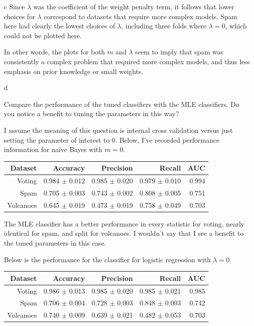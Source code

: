 \documentclass[fleqn]{homework}
\begin{document}
\begin{problem}{c}
    Since $\lambda$ was the coefficient of the weight penalty term, it follows
    that lower choices for $\lambda$ correspond to datasets that require more
    complex models.  Spam here had clearly the lowest choices of $\lambda$,
    including three folds where $\lambda=0$, which could not be plotted here.

    In other words, the plots for both $m$ and $\lambda$ seem to imply that spam
    was consistently a complex problem that required more complex models, and
    thus less emphasis on prior knowledge or small weights.
    
  \end{problem}

  \begin{problem}{d}
    \begin{question}
      Compare the performance of the tuned classifiers with the MLE classifiers.
      Do you notice a benefit to tuning the parameters in this way?
    \end{question}

    I assume the meaning of this question is internal cross validation versus
    just setting the parameter of interest to 0.  Below, I've recorded
    performance information for na\"ive Bayes with $m=0$.

    \vspace{0.3cm}
    \begin{tabular}{rrrrr}
      \hline
      Dataset & Accuracy & Precision & Recall & AUC \\
      \hline
      Voting & 0.984 $\pm$ 0.012 & 0.985 $\pm$ 0.020 & 0.979 $\pm$ 0.010 & 0.994 \\
      Spam & 0.705 $\pm$ 0.003 & 0.743 $\pm$ 0.002 & 0.808 $\pm$ 0.005 & 0.751 \\
      Volcanoes & 0.645 $\pm$ 0.019 & 0.473 $\pm$ 0.019 & 0.758 $\pm$ 0.049 & 0.703 \\
      \hline
    \end{tabular}
    \vspace{0.3cm}

    The MLE classifier has a better performance in every statistic for voting,
    nearly identical for spam, and split for volcanoes.  I wouldn't say that I
    see a benefit to the tuned parameters in this case.

    Below is the performance for the classifier for logistic regression with
    $\lambda=0$.

    \vspace{0.3cm}
    \begin{tabular}{rrrrr}
      \hline
      Dataset & Accuracy & Precision & Recall & AUC \\
      \hline
      Voting & 0.986 $\pm$ 0.013 & 0.985 $\pm$ 0.020 & 0.985 $\pm$ 0.021 & 0.985 \\
      Spam & 0.706 $\pm$ 0.004 & 0.728 $\pm$ 0.003 & 0.848 $\pm$ 0.003 & 0.742 \\
      Volcanoes & 0.740 $\pm$ 0.009 & 0.639 $\pm$ 0.021 & 0.482 $\pm$ 0.053 & 0.703 \\
      \hline
    \end{tabular}
    \vspace{0.3cm}


\end{problem}
\end{document}

